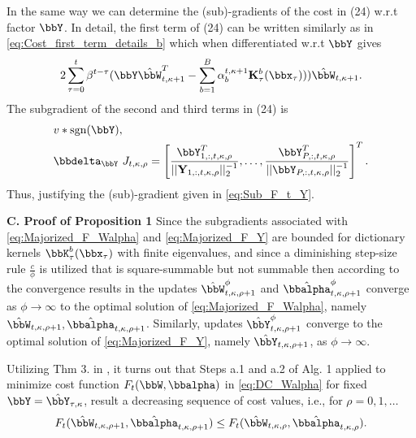 \documentclass[10pt,final]{IEEEtran}
\begin{document}
In the same way we can determine the (sub)-gradients of the cost in (24) w.r.t factor $\bbY$. In detail, the first term of (24) can be written similarly as in 
\eqref{eq:Cost_first_term_details_b} which when differentiated w.r.t $\bbY$ gives
\begin{align}\label{eq:Sub_F_t_W_2}
 2\sum_{\tau=0}^{t}\beta^{t-\tau}({\bbY}\hat{\bbW}_{t,\kappa+1}^T-\sum_{b=1}^{B}\alpha_{b}^{t,\kappa+1}\mathbf{K}_{\tau}^b(\bbx_{\tau})))\hat{\bbW}_{t,\kappa+1}.
 \end{align}
 The subgradient of the second and third terms in (24) is 
\begin{align}\label{eq:Sec_term}
& v*\textrm{sgn}({\bbY}),\\
& \bbdelta_{\bbY}\ J_{t,\kappa,\rho}=
\left[\frac{\bbY_{1,:,t,\kappa,\rho}^T}{||\mathbf{Y}_{1,:,t,\kappa,\rho}||_2^{-1}},\ldots,
\frac{\bbY_{P,:,t,\kappa,\rho}^T}{||{\bbY}_{P,:,t,\kappa,\rho}||_2^{-1}}
\right]^T.
\end{align}
 Thus, justifying the (sub)-gradient given in \eqref{eq:Sub_F_t_Y}.\myQED

\textbf{C. Proof of Proposition 1}\label{thm:Central_Conv}\newline
Since the subgradients associated with \eqref{eq:Majorized_F_Walpha} and 	\eqref{eq:Majorized_F_Y} are bounded for dictionary kernels $\bbK_{\tau}^b(\bbx_{\tau})$ with finite eigenvalues, and since a diminishing step-size rule $\frac{c}{\phi}$ is utilized that is square-summable but not summable then according to the convergence results in \cite[pg. 4-5]{subgradient methods}
the updates $\hat{\bbW}_{t,\kappa,\rho+1}^{\phi}$ and 
$\hat{\bbalpha}_{t,\kappa,\rho+1}^{\phi}$ converge as $\phi\rightarrow\infty$ to the optimal solution of \eqref{eq:Majorized_F_Walpha}, namely $\hat{\bbW}_{t,\kappa,\rho+1},\hat{\bbalpha}_{t,\kappa,\rho+1}$. Similarly, updates $\hat{\bbY}_{t,\kappa,\rho+1}^{\phi}$ converge to the optimal solution of 
\eqref{eq:Majorized_F_Y}, namely $\hat{\bbY}_{t,\kappa,\rho+1}$, as $\phi\rightarrow\infty$.

Utilizing Thm 3. in \cite{Convex Analysis}, it turns out that Steps a.1 and a.2 of Alg. 1  applied to minimize  cost function $F_t(\bbW,\bbalpha)$ in \eqref{eq:DC_Walpha} for fixed $\bbY=\hat{\bbY}_{\tau,\kappa}$,  
result a decreasing sequence of cost values, i.e., for $\rho=0,1,\ldots$
\begin{align}\label{eq:Decr_1}
F_t(\hat{\bbW}_{t,\kappa,\rho+1},\hat{\bbalpha}_{t,\kappa,\rho+1}) \leq 
F_t(\hat{\bbW}_{t,\kappa,\rho},\hat{\bbalpha}_{t,\kappa,\rho}). 
\end{align}
\end{document}
